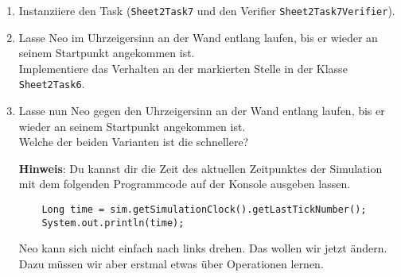 

\begin{enumerate}
    \item Instanziiere den Task (\lstinline{Sheet2Task7} und den Verifier \lstinline{Sheet2Task7Verifier}).
    \item Lasse Neo im Uhrzeigersinn an der Wand entlang laufen, bis er wieder an seinem Startpunkt angekommen ist.\\
        Implementiere das Verhalten an der markierten Stelle in der Klasse \lstinline{Sheet2Task6}.
    \item Lasse nun Neo gegen den Uhrzeigersinn an der Wand entlang laufen, bis er wieder an seinem Startpunkt angekommen ist.\\
        Welche der beiden Varianten ist die schnellere?

    \textbf{Hinweis}: Du kannst dir die Zeit des aktuellen Zeitpunktes der Simulation mit dem folgenden Programmcode auf der Konsole ausgeben lassen.

        \begin{lstlisting}
    Long time = sim.getSimulationClock().getLastTickNumber();
    System.out.println(time);
        \end{lstlisting}

        Neo kann sich nicht einfach nach links drehen.
        Das wollen wir jetzt ändern.
        Dazu müssen wir aber erstmal etwas über Operationen lernen.
\end{enumerate}



